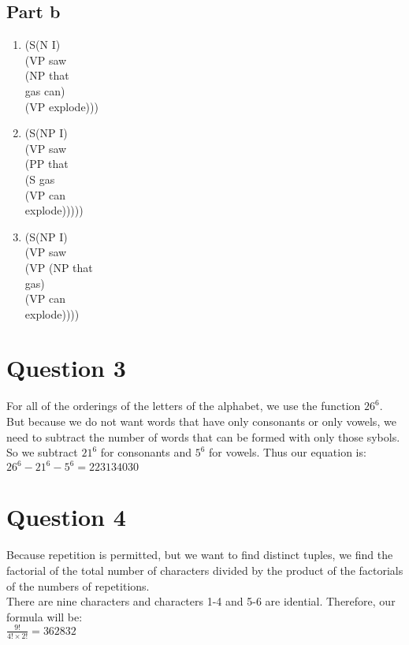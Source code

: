 \documentclass[11pt]{article}
\begin{document}
\subsection*{Part b}
\noindent
\begin{enumerate}
\item
(S\tab{}(N I)\\
\tab{}\tab{}(VP saw\\
\tab{}\tab{}\tab{}(NP that\\
\tab{}\tab{}\tab{}\tab{}gas can)\\
\tab{}\tab{}\tab{}(VP explode)))

\item 
(S\tab{}(NP I)\\
\tab{}\tab{}(VP saw\\
\tab{}\tab{}\tab{}(PP that\\
\tab{}\tab{}\tab{}\tab{}(S gas\\
\tab{}\tab{}\tab{}\tab{}\tab{}(VP can\\
\tab{}\tab{}\tab{}\tab{}\tab{}\tab{}explode)))))

\item
(S\tab{}(NP I)\\
\tab{}\tab{}(VP saw\\
\tab{}\tab{}\tab{}(VP (NP that\\
\tab{}\tab{}\tab{}\tab{}\tab{}gas)\\
\tab{}\tab{}\tab{}\tab{}(VP can\\
\tab{}\tab{}\tab{}\tab{}\tab{}explode))))

\end{enumerate}

\section*{Question 3}
\noindent
For all of the orderings of the letters of the alphabet, we use the function $ 26^{6} $. But because we do not want words that have only consonants or only vowels, we need to subtract the number of words that can be formed with only those sybols. So we subtract $ 21^{6} $ for consonants and $ 5^{6} $ for vowels. Thus our equation is:\\
$ 26^{6} - 21^{6} - 5^{6} = 223134030 $

\section*{Question 4}
\noindent
Because repetition is permitted, but we want to find distinct tuples, we find the factorial of the total number of characters divided by the product of the factorials of the numbers of repetitions.\\
\noindent
There are nine characters and characters 1-4 and 5-6 are idential. Therefore, our formula will be:\\
\noindent
$ \frac{9!}{4! \times 2!} = 362832 $
\end{document}
